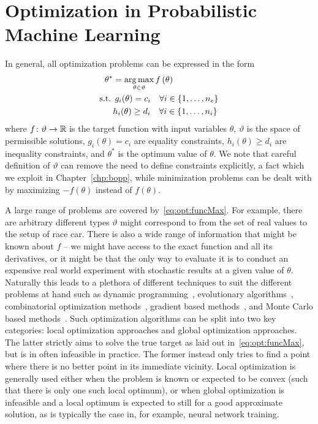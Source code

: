 
\section{Optimization in Probabilistic Machine Learning}
\label{sec:opt:intro}

In general, all optimization problems can be expressed in the form
\begin{align}
	\begin{split}
	\label{eq:opt:funcMax}
	\theta^* &= \operatorname*{arg\,max}_{\theta \in \vartheta} f\left(\theta\right) \\
	\text{s.t.} \: & \: g_i(\theta) = c_i \quad \forall i \in \{1,\dots,n_e\} \\
		 & h_i(\theta) \ge d_i \quad \forall i \in \{1,\dots,n_i\}
	\end{split}
\end{align}
where $f \colon \vartheta \rightarrow \mathbb{R}$ is the target function with input
variables $\theta$, $\vartheta$ is the space of permissible solutions, 
$g_i(\theta) = c_i$ are equality constraints, $h_i(\theta) \ge d_i$ are
inequality constraints, and $\theta^*$ is the optimum value of $\theta$.
We note that careful definition of $\vartheta$ can remove the need to
define constraints explicitly, a fact which we exploit in Chapter~\ref{chp:bopp},
while minimization problems can be dealt with by maximizing $-f\left(\theta\right)$
instead of $f\left(\theta\right)$.

A large range of problems are covered by~\eqref{eq:opt:funcMax}.  For example, 
there are arbitrary different types $\vartheta$ might correspond to from the set of real
values to the setup of race car.  There is also a wide range of information that might
be known about $f$ -- we might have access to the exact function and all its derivatives,
or it might be that the only way to evaluate it is to conduct an expensive real world 
experiment with stochastic results at a given value of $\theta$.  Naturally this leads 
to a plethora of different techniques to suit the different problems at hand such
as dynamic programming~\citep{bellman2013dynamic}, evolutionary 
algorithms~\citep{back1996evolutionary}, combinatorial optimization 
methods~\citep{papadimitriou1982combinatorial}, gradient based 
methods~\citep{boyd2004convex}, and Monte Carlo based methods~\citep{robert2004monte}.
Such optimization algorithms can be split into two key categories:
local optimization approaches and global optimization approaches.  
The latter strictly aims to solve the true target as laid out in~\eqref{eq:opt:funcMax}, but
is in often infeasible in practice.
The former instead only tries to find a point where there is no better point in its immediate vicinity. 
Local optimization is generally
used either when the problem is known or expected to be convex (such that there is only
one such local optimum), or when global optimization is infeasible and a local
optimum is expected to still for a good approximate solution, as is typically the case in,
for example, neural network training.

